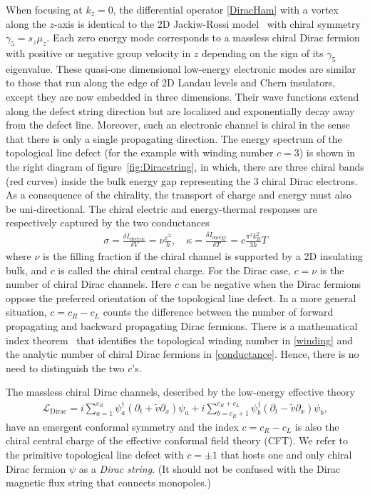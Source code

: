 When focusing at $k_z=0$, the differential operator \eqref{DiracHam} with a vortex along the $z$-axis is identical to the 2D Jackiw-Rossi model~\cite{JackiwRossi81} with chiral symmetry $\gamma_5=s_z\mu_z$. Each zero energy mode corresponds to a massless chiral Dirac fermion with positive or negative group velocity in $z$ depending on the sign of its $\gamma_5$ eigenvalue. These quasi-one dimensional low-energy electronic modes are similar to those that run along the edge of 2D Landau levels and Chern insulators, except they are now embedded in three dimensions. Their wave functions extend along the defect string direction but are localized and exponentially decay away from the defect line. Moreover, such an electronic channel is chiral in the sense that there is only a single propagating direction. The energy spectrum of the topological line defect (for the example with winding number $c=3$) is shown in the right diagram of figure~\ref{fig:Diracstring}, in which, there are three chiral bands (red curves) inside the bulk energy gap representing the 3 chiral Dirac electrons. As a consequence of the chirality, the transport of charge and energy must also be uni-directional. The chiral electric and energy-thermal responses are respectively captured by the two conductances \begin{align}\sigma=\frac{\delta I_{\mathrm{electric}}}{\delta V}=\nu\frac{e^2}{h},\quad\kappa=\frac{\delta I_{\mathrm{energy}}}{\delta T}=c\frac{\pi^2k_B^2}{3h}T\label{conductance}\end{align} where $\nu$ is the filling fraction if the chiral channel is supported by a 2D insulating bulk, and $c$ is called the chiral central charge. For the Dirac case, $c=\nu$ is the number of chiral Dirac channels. Here $c$ can be negative when the Dirac fermions oppose the preferred orientation of the topological line defect. In a more general situation, $c=c_R-c_L$ counts the difference between the number of forward propagating and backward propagating Dirac fermions. There is a mathematical index theorem~\cite{TeoKane,AtiyahSinger63,Nakaharabook} that identifies the topological winding number in \eqref{winding} and the analytic number of chiral Dirac fermions in \eqref{conductance}. Hence, there is no need to distinguish the two $c$'s. 

The massless chiral Dirac channels, described by the low-energy effective theory \begin{align}\mathcal{L}_{\mathrm{Dirac}}=i\sum_{a=1}^{c_R}\psi^\dagger_a(\partial_t+\tilde{v}\partial_x)\psi_a+i\sum_{b=c_R+1}^{c_R+c_L}\psi^\dagger_b(\partial_t-\tilde{v}\partial_x)\psi_b,\end{align} have an emergent conformal symmetry and the index $c=c_R-c_L$ is also the chiral central charge of the effective conformal field theory (\hypertarget{CFT}{CFT}). We refer to the primitive topological line defect with $c=\pm1$ that hosts one and only chiral Dirac fermion $\psi$ as a {\em Dirac string}. (It should not be confused with the Dirac magnetic flux string that connects monopoles.)

